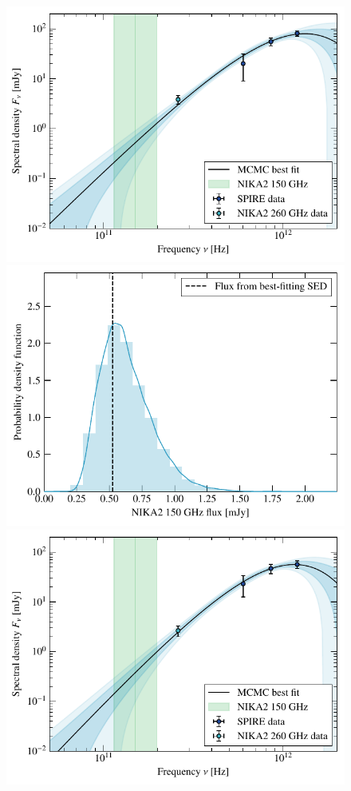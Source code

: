 \begin{figure}[p]
    \centering
    \includegraphics[height=0.23\textheight]{Figures/Chap_actj0215/PSPlots/1_SED_no2mm.pdf} \hspace{20pt}
    \includegraphics[height=0.23\textheight]{Figures/Chap_actj0215/PSPlots/1_2mm_flux_dist.pdf}
    \includegraphics[height=0.23\textheight]{Figures/Chap_actj0215/PSPlots/2_SED_no2mm.pdf} \hspace{20pt}

\end{figure}
